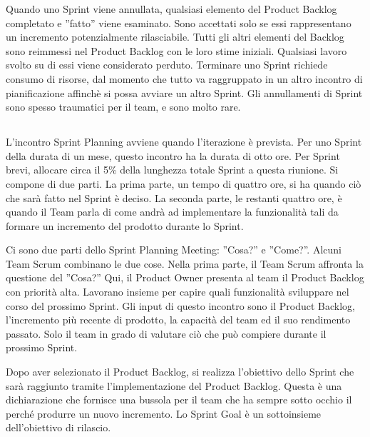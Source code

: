 Quando uno Sprint viene annullata, qualsiasi elemento del Product Backlog completato e ''fatto'' viene esaminato. Sono
accettati solo se essi rappresentano un incremento potenzialmente rilasciabile. Tutti gli altri elementi del Backlog
sono reimmessi nel Product Backlog con le loro stime iniziali. Qualsiasi lavoro svolto su di essi viene considerato
perduto. Terminare uno Sprint richiede consumo di risorse, dal momento che tutto va raggruppato in un altro incontro di
pianificazione affinch\`e si possa avviare un altro Sprint. Gli annullamenti di Sprint sono spesso traumatici per il
team, e sono molto rare.

\subsection*{\color{Blue}{SPRINT PLANNING MEETING}}
\label{sec:sprintplannnigmeeting}
L'incontro Sprint Planning avviene quando l'iterazione \`e prevista. Per uno Sprint della durata di un mese, questo
incontro ha la durata di otto ore. Per Sprint brevi, allocare circa il 5\% della lunghezza totale Sprint a questa
riunione. Si compone di due parti. La prima parte, un tempo di quattro ore, si ha quando ci\`o che sar\`a fatto nel
Sprint \`e deciso. La seconda parte, le restanti quattro ore, \`e quando il Team parla di come andr\`a ad implementare
la funzionalit\`a tali da formare un incremento del prodotto durante lo Sprint.
\newline

Ci sono due parti dello Sprint Planning Meeting: ''Cosa?'' e ''Come?''. Alcuni Team Scrum combinano le due cose. Nella
prima parte, il Team Scrum affronta la questione del ''Cosa?'' Qui, il Product Owner presenta al team il Product
Backlog con priorit\`a alta. Lavorano insieme per capire quali funzionalit\`a sviluppare nel corso del prossimo Sprint.
Gli input di questo incontro sono il Product Backlog, l'incremento pi\`u recente di prodotto, la capacit\`a del team ed
il suo rendimento passato. Solo il team in grado di valutare ci\`o che pu\`o compiere durante il prossimo Sprint.
\newline

Dopo aver selezionato il Product Backlog, si realizza l'obiettivo dello Sprint che sar\`a raggiunto tramite
l'implementazione del Product Backlog. Questa \`e una dichiarazione che fornisce una bussola per il team che ha sempre
sotto occhio il perch\'e produrre un nuovo incremento. Lo Sprint Goal \`e un sottoinsieme dell'obiettivo di rilascio.
\newline

